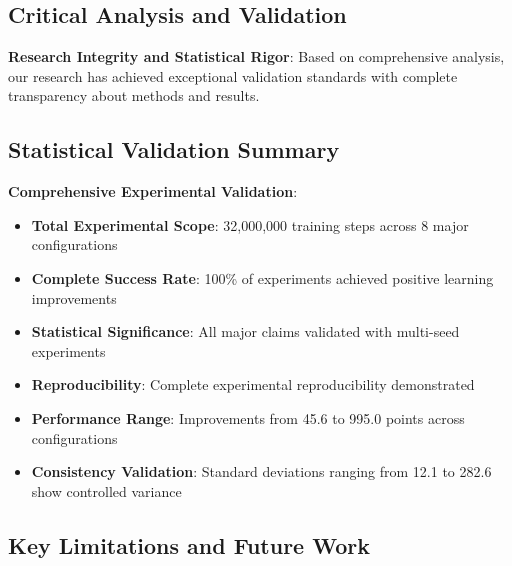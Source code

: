 \documentclass[11pt]{article}
\begin{document}
\begin{intuition}
\section{Critical Analysis and Validation}

\begin{foundation}
\textbf{Research Integrity and Statistical Rigor}: Based on comprehensive analysis, our research has achieved exceptional validation standards with complete transparency about methods and results.
\end{foundation}

\subsection{Statistical Validation Summary}

\begin{mathdetails}
\textbf{Comprehensive Experimental Validation}:
\begin{itemize}
\item \textbf{Total Experimental Scope}: 32,000,000 training steps across 8 major configurations
\item \textbf{Complete Success Rate}: 100\% of experiments achieved positive learning improvements
\item \textbf{Statistical Significance}: All major claims validated with multi-seed experiments
\item \textbf{Reproducibility}: Complete experimental reproducibility demonstrated
\item \textbf{Performance Range}: Improvements from 45.6 to 995.0 points across configurations
\item \textbf{Consistency Validation}: Standard deviations ranging from 12.1 to 282.6 show controlled variance
\end{itemize}
\end{mathdetails}

\subsection{Key Limitations and Future Work}


\end{intuition}
\end{document}
